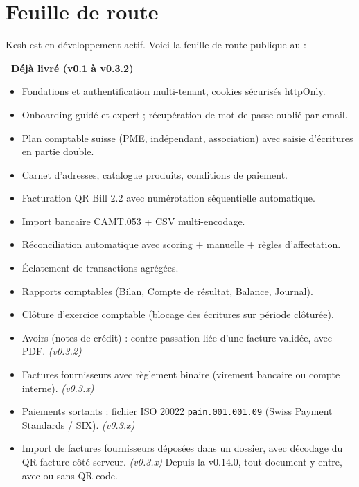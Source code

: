 \documentclass[a4paper,11pt,oneside]{article}
\begin{document}

\clearpage

\section*{\color{keshPrimary}Feuille de route}

Kesh est en développement actif. Voici la feuille de route publique au \keshReleaseDate :

\vspace{0.5cm}

\textbf{\color{keshSuccess}\faCheckCircle\ Déjà livré (v0.1 à v0.3.2)}

\begin{itemize}
    \item Fondations et authentification multi-tenant, cookies sécurisés httpOnly.
    \item Onboarding guidé et expert ; récupération de mot de passe oublié par email.
    \item Plan comptable suisse (PME, indépendant, association) avec saisie d'écritures en partie double.
    \item Carnet d'adresses, catalogue produits, conditions de paiement.
    \item Facturation QR Bill 2.2 avec numérotation séquentielle automatique.
    \item Import bancaire CAMT.053 + CSV multi-encodage.
    \item Réconciliation automatique avec scoring + manuelle + règles d'affectation.
    \item Éclatement de transactions agrégées.
    \item Rapports comptables (Bilan, Compte de résultat, Balance, Journal).
    \item Clôture d'exercice comptable (blocage des écritures sur période clôturée).
    \item Avoirs (notes de crédit) : contre-passation liée d'une facture validée, avec PDF. \emph{(v0.3.2)}
    \item Factures fournisseurs avec règlement binaire (virement bancaire ou compte interne). \emph{(v0.3.x)}
    \item Paiements sortants : fichier ISO 20022 \texttt{pain.001.001.09} (Swiss Payment Standards / SIX). \emph{(v0.3.x)}
    \item Import de factures fournisseurs déposées dans un dossier, avec décodage du QR-facture côté serveur. \emph{(v0.3.x)} Depuis la v0.14.0, tout document y entre, avec ou sans QR-code.

\end{itemize}
\end{document}
